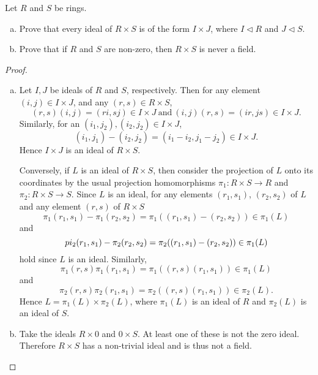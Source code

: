 \documentclass[10pt]{amsart}
\begin{document}
\begin{thm}
  Let $R$ and $S$ be rings.
  \begin{enumerate}[(a)]
  \item
    Prove that every ideal of $R \times S$ is of the form $I \times J$, where $I \lhd R$ and $J \lhd S$.
  \item
    Prove that if $R$ and $S$ are non-zero, then $R \times S$ is never a field.
  \end{enumerate}
  \begin{proof}
    \begin{enumerate}[(a)]
    \item
      Let $I, J$ be ideals of $R$ and $S$, respectively.
      Then for any element $(i,j) \in I \times J$, and any $(r,s) \in R \times S$,
      $$(r,s)(i,j) = (ri,sj) \in I \times J\ \text{and}\ (i,j)(r,s) = (ir,js) \in I \times J.$$
      Similarly, for an $(i_1,j_2), (i_2,j_2) \in I \times J$,
      $$(i_1,j_1) - (i_2,j_2) = (i_1 - i_2, j_1 - j_2) \in I \times J.$$
      Hence $I \times J$ is an ideal of $R \times S$.
      
      Conversely, if $L$ is an ideal of $R \times S$, then consider the projection of $L$ onto its coordinates by the usual projection homomorphisms $\pi_1 \colon R \times S \rightarrow R$ and $\pi_2 \colon R \times S \rightarrow S$.
      Since $L$ is an ideal, for any elements $(r_1, s_1)$, $(r_2,s_2)$ of $L$ and any element $(r,s)$ of $R \times S$
      $$\pi_1(r_1,s_1) - \pi_1(r_2,s_2) = \pi_1((r_1,s_1) - (r_2,s_2)) \in \pi_1(L)$$
      and
      $$\\pi_2(r_1,s_1) - \pi_2(r_2,s_2) = \pi_2((r_1,s_1) - (r_2,s_2)) \in \pi_1(L)$$
      hold since $L$ is an ideal.
      Similarly, 
      $$\pi_1(r,s)\pi_1(r_1,s_1) = \pi_1((r,s)(r_1,s_1)) \in \pi_1(L)$$
      and
      $$\pi_2(r,s)\pi_2(r_1,s_1) = \pi_2((r,s)(r_1,s_1)) \in \pi_2(L).$$
      Hence $L = \pi_1(L) \times \pi_2(L)$, where $\pi_1(L)$ is an ideal of $R$ and $\pi_2(L)$ is an ideal of $S$.
    \item
      Take the ideals $R \times 0$ and $0 \times S$.
      At least one of these is not the zero ideal.
      Therefore $R \times S$ has a non-trivial ideal and is thus not a field.
    \end{enumerate}
  \end{proof}
\end{thm}
\end{document}
